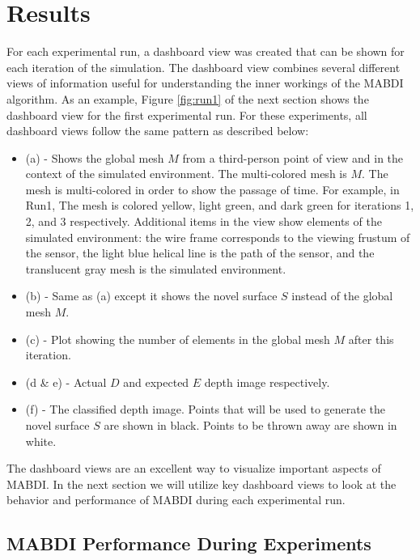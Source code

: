 \chapter{Results} \label{chapter:results}


For each experimental run, a dashboard view was created that can be shown for
each iteration of the simulation. The dashboard view combines several different
views of information useful for understanding the inner workings of the MABDI
algorithm. As an example, Figure \ref{fig:run1} of the next section shows the
dashboard view for the first experimental run. For these experiments, all
dashboard views follow the same pattern as described below:

\begin{itemize}
  \item (a) - Shows the global mesh $M$ from a third-person point of view and in
  the context of the simulated environment. The multi-colored mesh is $M$. The
  mesh is multi-colored in order to show the passage of time. For example, in
  Run1, The mesh is colored yellow, light green, and dark green for iterations
  1, 2, and 3 respectively. Additional items in the view show elements of the
  simulated environment: the wire frame corresponds to the viewing frustum of
  the sensor, the light blue helical line is the path of the sensor, and the
  translucent gray mesh is the simulated environment.
  \item (b) - Same as (a) except it shows the novel surface $S$ instead of
  the global mesh $M$.
  \item (c) - Plot showing the number of elements in the global mesh $M$
  after this iteration.
  \item (d \& e) - Actual $D$ and expected $E$ depth image
  respectively.
  \item (f) - The classified depth image. Points that will be used to generate
  the novel surface $S$ are shown in black. Points to be thrown away are shown
  in white.
\end{itemize}

The dashboard views are an excellent way to visualize important aspects of
MABDI. In the next section we will utilize key dashboard views to look at the
behavior and performance of MABDI during each experimental run.

\section{MABDI Performance During Experiments}


